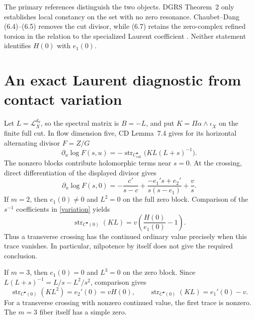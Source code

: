 \documentclass[11pt]{article}
\newcommand{\str}{\operatorname{str}}
\newcommand{\LL}{\mathcal L}
\begin{document}
The primary references distinguish the two objects. DGRS Theorem~2
only establishes local constancy on the set with no zero resonance.
Chaubet--Dang (6.4)--(6.5) removes the cut divisor, while (6.7) retains
the zero-complex refined torsion in the relation to the specialized
Laurent coefficient \cite{DGRS,CD}. Neither statement identifies
$H(0)$ with $e_1(0)$.

\section{An exact Laurent diagnostic from contact variation}
Let $L=\LL_X^{d_\theta}$, so the spectral matrix is $B=-L$, and put
$K=\Pi\alpha\wedge\iota_{\dot X}$ on the finite full cut.
In flow dimension five, CD Lemma~7.4 gives for its horizontal
alternating divisor $F=Z/G$
\begin{equation}\label{variation}
 \partial_u\log F(s,u)
 =-\str_{C_{\mathrm{cut}}^\bullet}
       \bigl(K L(L+s)^{-1}\bigr).
\end{equation}
The nonzero blocks contribute holomorphic terms near $s=0$.
At the crossing, direct differentiation of the displayed divisor gives
\[
 \partial_u\log F(s,0)
 =-\frac{c'}{s-c}
   +\frac{-e_1's+e_2'}{s(s-e_1)}+\frac{v}{s}.
\]
If $m=2$, then $e_1(0)\ne0$ and $L^2=0$ on the full zero block.
Comparison of the $s^{-1}$ coefficients in \eqref{variation} yields
\begin{equation}\label{m2trace}
 \str_{C^\bullet(0)}(KL)
    =v\left(\frac{H(0)}{e_1(0)}-1\right).
\end{equation}
Thus a transverse crossing has the continued ordinary value precisely
when this trace vanishes. In particular, nilpotence by itself does not
give the required conclusion.

If $m=3$, then $e_1(0)=0$ and $L^3=0$ on the zero block. Since
$L(L+s)^{-1}=L/s-L^2/s^2$, comparison gives
\begin{equation}\label{m3trace}
 \str_{C^\bullet(0)}(KL^2)=e_2'(0)=vH(0),\qquad
 \str_{C^\bullet(0)}(KL)=e_1'(0)-v.
\end{equation}
For a transverse crossing with nonzero continued value, the first
trace is nonzero. The $m=3$ fiber itself has a simple zero.
\end{document}
